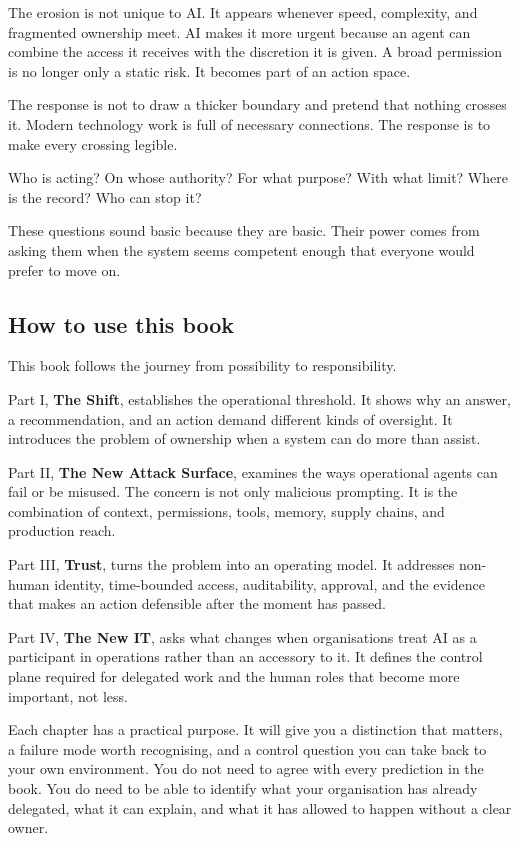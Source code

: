 The erosion is not unique to AI. It appears whenever speed, complexity,
and fragmented ownership meet. AI makes it more urgent because an agent
can combine the access it receives with the discretion it is given. A
broad permission is no longer only a static risk. It becomes part of an
action space.

The response is not to draw a thicker boundary and pretend that nothing
crosses it. Modern technology work is full of necessary connections. The
response is to make every crossing legible.

Who is acting? On whose authority? For what purpose? With what limit?
Where is the record? Who can stop it?

These questions sound basic because they are basic. Their power comes
from asking them when the system seems competent enough that everyone
would prefer to move on.

\subsection{How to use this book}\label{how-to-use-this-book}

This book follows the journey from possibility to responsibility.

Part I, \textbf{The Shift}, establishes the operational threshold. It
shows why an answer, a recommendation, and an action demand different
kinds of oversight. It introduces the problem of ownership when a system
can do more than assist.

Part II, \textbf{The New Attack Surface}, examines the ways operational
agents can fail or be misused. The concern is not only malicious
prompting. It is the combination of context, permissions, tools, memory,
supply chains, and production reach.

Part III, \textbf{Trust}, turns the problem into an operating model. It
addresses non-human identity, time-bounded access, auditability,
approval, and the evidence that makes an action defensible after the
moment has passed.

Part IV, \textbf{The New IT}, asks what changes when organisations treat
AI as a participant in operations rather than an accessory to it. It
defines the control plane required for delegated work and the human
roles that become more important, not less.

Each chapter has a practical purpose. It will give you a distinction
that matters, a failure mode worth recognising, and a control question
you can take back to your own environment. You do not need to agree with
every prediction in the book. You do need to be able to identify what
your organisation has already delegated, what it can explain, and what
it has allowed to happen without a clear owner.

